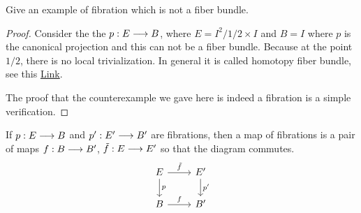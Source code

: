 \documentclass[11pt]{book} %
\begin{document}
\begin{exr}
Give an example of fibration which is not a fiber bundle.
\end{exr}
\begin{proof}
Consider the the $p: E\longrightarrow B$, where $E=I^2/{1/2}\times I$ and $B=I$ where $p$ is the canonical projection and this can not be a fiber bundle. Because at the point $1/2$, there is no local trivialization. In general it is called homotopy fiber bundle, see this \href{https://math.stackexchange.com/questions/6428/is-there-anywhere-we-use-a-fibration-which-is-not-a-fiber-bundle/9589}{Link}. 

The proof that the counterexample we gave here is indeed a fibration is a simple verification.
\end{proof}

\begin{definition}
If $p: E\longrightarrow B$ and $p': E'\longrightarrow B'$ are  fibrations, then a map of fibrations is a pair of maps $f: B\longrightarrow B'$, $\tilde{f}: E\longrightarrow E'$ so that the diagram commutes.
$$
\begin{tikzcd}
E \arrow[d, "p"] \arrow[r, "\tilde{f}"] & E' \arrow[d, "p'"] \\
B \arrow[r, "f"] & B'
\end{tikzcd}
$$
\end{definition}
\end{document}
